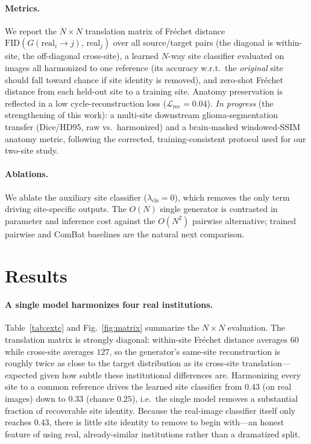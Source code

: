 \documentclass[runningheads]{llncs}
\begin{document}
\paragraph{Metrics.}
We report the $N{\times}N$ translation matrix of Fr\'echet distance
$\mathrm{FID}(G(\text{real}_i\!\to\!j),\,\text{real}_j)$ over all source/target
pairs (the diagonal is within-site, the off-diagonal cross-site), a learned
$N$-way site classifier evaluated on images all harmonized to one reference (its
accuracy w.r.t.\ the \emph{original} site should fall toward chance if site
identity is removed), and zero-shot Fr\'echet distance from each held-out site to
a training site. Anatomy preservation is reflected in a low cycle-reconstruction
loss ($\mathcal{L}_{\mathrm{rec}}{=}0.04$). \emph{In progress} (the strengthening
of this work): a multi-site downstream glioma-segmentation transfer (Dice/HD95,
raw vs.\ harmonized) and a brain-masked windowed-SSIM anatomy metric, following
the corrected, training-consistent protocol used for our two-site study.

\paragraph{Ablations.}
We ablate the auxiliary site classifier ($\lambda_{\mathrm{cls}}{=}0$), which
removes the only term driving site-specific outputs. The $O(N)$ single generator
is contrasted in parameter and inference cost against the $O(N^2)$ pairwise
alternative; trained pairwise and ComBat baselines are the natural next
comparison.

\section{Results}
\label{sec:results}
\paragraph{A single model harmonizes four real institutions.}
Table~\ref{tab:extc} and Fig.~\ref{fig:matrix} summarize the $N{\times}N$
evaluation. The translation matrix is strongly diagonal: within-site Fr\'echet
distance averages $60$ while cross-site averages $127$, so the generator's
same-site reconstruction is roughly twice as close to the target distribution as
its cross-site translation---expected given how subtle these institutional
differences are. Harmonizing every site to a common reference drives the learned
site classifier from $0.43$ (on real images) down to $0.33$ (chance $0.25$),
i.e.\ the single model removes a substantial fraction of recoverable site
identity. Because the real-image classifier itself only reaches $0.43$, there is
little site identity to remove to begin with---an honest feature of using real,
already-similar institutions rather than a dramatized split.
\end{document}
